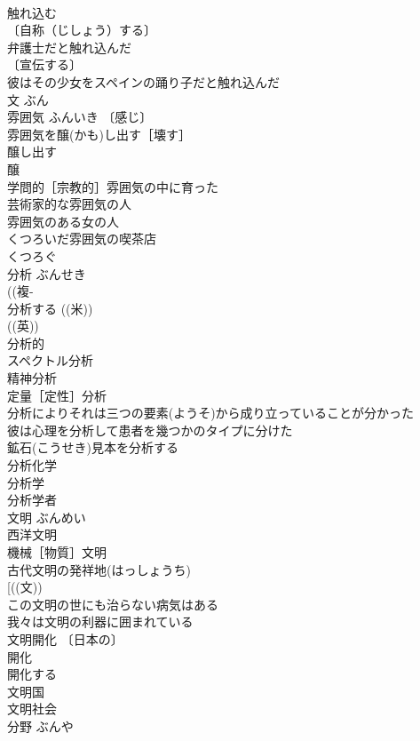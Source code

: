 \documentclass[8pt]{extreport}
\begin{document}
\begin{CJK}{UTF8}{min}
\\	触れ込む　
\\	〔自称（じしょう）する〕　
\\	弁護士だと触れ込んだ 
\\	〔宣伝する〕　
\\	彼はその少女をスペインの踊り子だと触れ込んだ 
\\	文	ぶん	
\\	雰囲気	ふんいき	〔感じ〕
\\	雰囲気を醸(かも)し出す［壊す］ 
\\	醸し出す　
\\	醸 
\\	学問的［宗教的］雰囲気の中に育った 
\\	芸術家的な雰囲気の人 
\\	雰囲気のある女の人 
\\	くつろいだ雰囲気の喫茶店 
\\	くつろぐ 
\\	分析	ぶんせき	
\\	((複-
\\	分析する ((米)) 
\\	((英)) 
\\	分析的 
\\	スペクトル分析 
\\	精神分析 
\\	定量［定性］分析 
\\	分析によりそれは三つの要素(ようそ)から成り立っていることが分かった 
\\	彼は心理を分析して患者を幾つかのタイプに分けた 
\\	鉱石(こうせき)見本を分析する 
\\	分析化学 
\\	分析学 
\\	分析学者 
\\	文明	ぶんめい	
\\	西洋文明 
\\	機械［物質］文明 
\\	古代文明の発祥地(はっしょうち) 
\\	[((文)) 
\\	この文明の世にも治らない病気はある 
\\	我々は文明の利器に囲まれている 
\\	文明開化 〔日本の〕
\\	開化　
\\	開化する 
\\	文明国 
\\	文明社会 
\\	分野	ぶんや	

\end{CJK}
\end{document}
